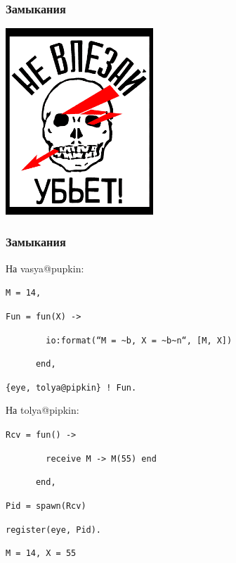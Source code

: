\documentclass{beamer}
\begin{document}
\begin{frame}[fragile]
  \frametitle{Замыкания}
  \begin{center}
    \includegraphics[height=7cm]{kz.png}
  \end{center}
\end{frame}

\begin{frame}[fragile]
  \frametitle{Замыкания}
  На vasya@pupkin:

  \begin{block}{}
    \texttt{M = 14,}

    \texttt{Fun = {\color{magenta}fun}(X) ->}

    \verb+        +\texttt{{\color{magenta}io:format}({\color{orange}``M = \~{}b, X = \~{}b\~{}n``}, [M, X])}

    \verb+      +\texttt{{\color{magenta}end},}

    \texttt{\{eye, {\color{blue}tolya@pipkin}\} ! Fun.}

  \end{block}
  \pause

  На tolya@pipkin:

  \begin{block}{}
    \texttt{Rcv = {\color{magenta}fun}() ->}

    \verb+        +\texttt{{\color{magenta}receive} M -> M(55) {\color{magenta}end}}

    \verb+      +\texttt{{\color{magenta}end},}

    \texttt{Pid = {\color{magenta}spawn}(Rcv)}

    \texttt{{\color{magenta}register}(eye, Pid).}

  \end{block}

  \pause

  \begin{block}{}
    \texttt{M = 14, X = 55}
  \end{block}




\end{frame}
\end{document}
